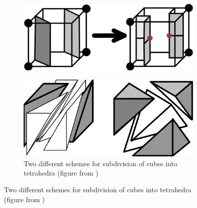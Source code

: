\begin{figure}
\begin{center}
\begin{subfigure}[t]{.45\textwidth}
\begin{center}
\includegraphics[width = .8\textwidth]{Pictures/SurfaceReconstruction/MCtoDualMC.png}
\end{center}
\end{subfigure}
\hfill
\begin{subfigure}[t]{.45\textwidth}
\begin{center}
\includegraphics[width = .8\textwidth]{Pictures/SurfaceReconstruction/SplittingCubes.png}
\caption{Two different schemes for subdivision of cubes into tetrahedra (figure from \cite{Nielson2008})}
\label{fig:splittingCubes}
\end{center}
\end{subfigure}
\end{center}
\end{figure}

